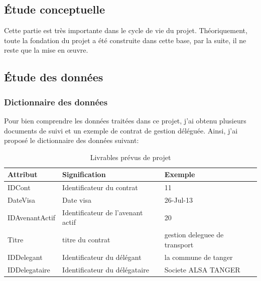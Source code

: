 \documentclass[a4paper]{report}
\begin{document}
\begin{doublespace}
	\chapter{Étude conceptuelle}
	\renewcommand{\headrulewidth}{1pt}
	\fancyhead[L]{\hspace*{5cm}}
	Cette partie est très importante dans le cycle de vie du projet. Théoriquement, toute la fondation du projet a été construite dans cette base, par la suite, il ne reste que la mise en œuvre.
	\section{Étude des données}
	\subsection{Dictionnaire des données}
	Pour bien comprendre les données traitées dans ce projet, j'ai obtenu plusieurs documents de suivi et un exemple de contrat de gestion déléguée. Ainsi, j'ai proposé le dictionnaire des données suivant:
	\begin{table}[H]
		\begin{center}
			\begin{tabularx}{17.5cm}{|X|X|X|}
				\hline
				\textbf{Attribut} & \textbf{Signification}            &
				\textbf{Exemple}                                                            \\
				\hline
				IDCont            & Identificateur du contrat         & 11                  \\
				\hline
				DateVisa          & Date visa                         & 26-Jul-13           \\
				\hline
				IDAvenantActif    & Identificateur de l'avenant actif &
				20                                                                          \\
				\hline
				Titre             & titre du contrat                  & gestion deleguee de
				transport                                                                   \\
				\hline
				IDDelegant        & Identificateur du délégant        & la commune de
				tanger                                                                      \\
				\hline
				IDDelegataire     & Identificateur du délégataire     & Societe ALSA
				TANGER                                                                      \\
				\hline
			\end{tabularx}
			\caption{Livrables prévus de projet}
		\end{center}
	\end{table}
	

\end{doublespace}
\end{document}

